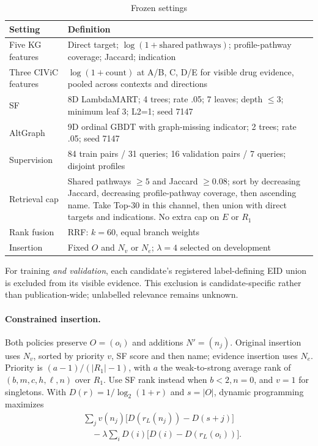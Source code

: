 \begin{table}[t]
\caption{Frozen settings}
\label{tab:settings}
\centering\small
\setlength{\tabcolsep}{4pt}
\begin{tabularx}{\textwidth}{@{}lX@{}}
\toprule
Setting & Definition \\
\midrule
Five KG features & Direct target; $\log(1+\mathrm{shared\ pathways})$; profile-pathway coverage; Jaccard; indication \\
Three CIViC features & $\log(1+\mathrm{count})$ at A/B, C, D/E for visible drug evidence, pooled across contexts and directions \\
SF & 8D LambdaMART; 4 trees; rate .05; 7 leaves; depth $\leq3$; minimum leaf 3; L2=1; seed 7147 \\
AltGraph & 9D ordinal GBDT with graph-missing indicator; 2 trees; rate .05; seed 7147 \\
Supervision & 84 train pairs / 31 queries; 16 validation pairs / 7 queries; disjoint profiles \\
Retrieval cap & Shared pathways $\geq5$ and Jaccard $\geq0.08$; sort by decreasing Jaccard, decreasing profile-pathway coverage, then ascending name. Take Top-30 in this channel, then union with direct targets and indications. No extra cap on $E$ or $R_1$ \\
Rank fusion & RRF: $k=60$, equal branch weights \\
Insertion & Fixed $O$ and $N_v$ or $N_e$; $\lambda=4$ selected on development \\
\bottomrule
\end{tabularx}
\end{table}

For training \emph{and validation}, each candidate's registered label-defining EID union is excluded from its visible evidence. This exclusion is candidate-specific rather than publication-wide; unlabelled relevance remains unknown.

\begin{samepage}
\paragraph{Constrained insertion.}
Both policies preserve $O=(o_i)$ and additions $N'=(n_j)$. Original insertion uses $N_v$, sorted by priority $v$, SF score and then name; evidence insertion uses $N_e$. Priority is $(a-1)/(|R_1|-1)$, with $a$ the weak-to-strong average rank of $(b,m,c,h,\ell,n)$ over $R_1$. Use SF rank instead when $b<2,n=0$, and $v=1$ for singletons. With $D(r)=1/\log_2(1+r)$ and $s=|O|$, dynamic programming maximizes
\[
\begin{aligned}
&\sum_j v(n_j)\bigl[D(r_L(n_j))-D(s+j)\bigr] \\
&\quad-\lambda\sum_i D(i)\bigl[D(i)-D(r_L(o_i))\bigr].
\end{aligned}
\]
\end{samepage}

